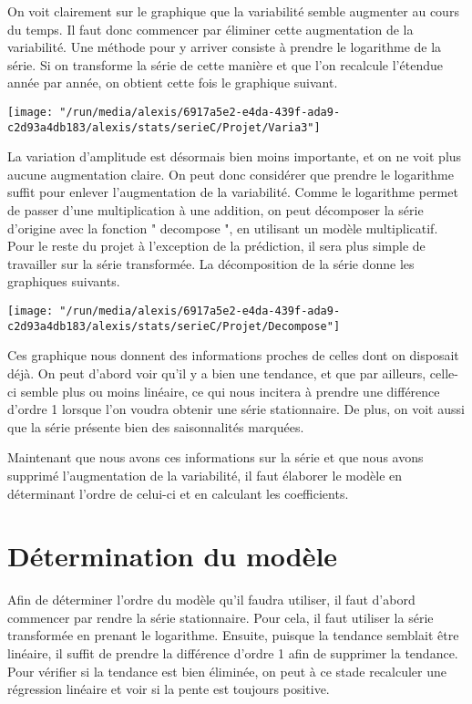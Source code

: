 \documentclass[11pt,a4paper]{article}
\begin{document}
On voit clairement sur le graphique que la variabilité semble augmenter au cours du temps. Il faut donc commencer par éliminer cette augmentation de la variabilité. Une méthode pour y arriver consiste à prendre le logarithme de la série. Si on transforme la série de cette manière et que l'on recalcule l'étendue année par année, on obtient cette fois le graphique suivant.
	
\begin{center}
\texttt{[image: "/run/media/alexis/6917a5e2-e4da-439f-ada9-c2d93a4db183/alexis/stats/serieC/Projet/Varia3"]}
\end{center}

La variation d'amplitude est désormais bien moins importante, et on ne voit plus aucune augmentation claire. On peut donc considérer que prendre le logarithme suffit pour enlever l'augmentation de la variabilité. Comme le logarithme permet de passer d'une multiplication à une addition, on peut décomposer la série d'origine avec la fonction " decompose ", en utilisant un modèle multiplicatif. Pour le reste du projet à l'exception de la prédiction, il sera plus simple de travailler sur la série transformée. La décomposition de la série donne les graphiques suivants.
\bigskip

\begin{center}
\texttt{[image: "/run/media/alexis/6917a5e2-e4da-439f-ada9-c2d93a4db183/alexis/stats/serieC/Projet/Decompose"]}
\end{center}

Ces graphique nous donnent des informations proches de celles dont on disposait déjà. On peut d'abord voir qu'il y a bien une tendance, et que par ailleurs, celle-ci semble plus ou moins linéaire, ce qui nous incitera à prendre une différence d'ordre 1 lorsque l'on voudra obtenir une série stationnaire. De plus, on voit aussi que la série présente bien des saisonnalités marquées.\bigskip

Maintenant que nous avons ces informations sur la série et que nous avons supprimé l'augmentation de la variabilité, il faut élaborer le modèle en déterminant l'ordre de celui-ci et en calculant les coefficients.

\section{Détermination du modèle}
\bigskip

Afin de déterminer l'ordre du modèle qu'il faudra utiliser, il faut d'abord commencer par rendre la série stationnaire. Pour cela, il faut utiliser la série transformée en prenant le logarithme. Ensuite, puisque la tendance semblait être linéaire, il suffit de prendre la différence d'ordre 1 afin de supprimer la tendance. Pour vérifier si la tendance est bien éliminée, on peut à ce stade recalculer une régression linéaire et voir si la pente est toujours positive.\bigskip
\end{document}

